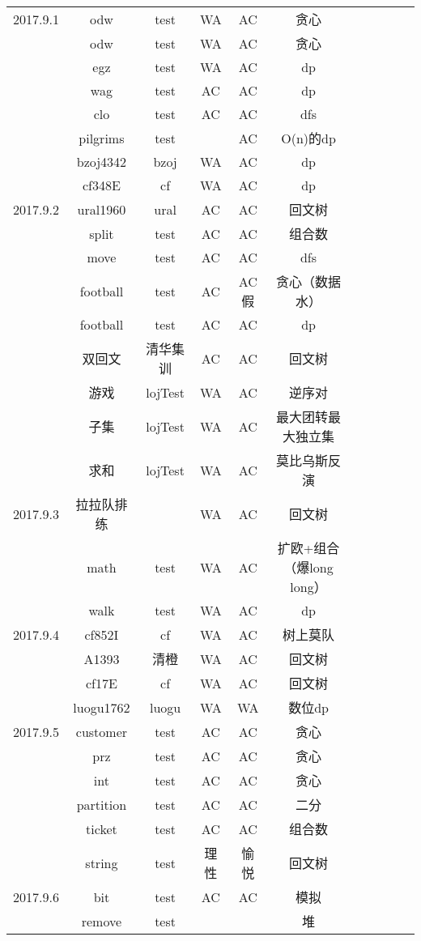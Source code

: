 \documentclass[landscape]{article}
\begin{document}
\begin{longtable}{ccccccccccc}
  \hline
  2017.9.1 & odw & test & WA & AC & 贪心\\
  & odw & test & WA & AC & 贪心\\
  & egz & test & WA & AC & dp\\
  & wag & test & AC & AC & dp\\
  & clo & test & AC & AC & dfs\\
  & pilgrims & test & & AC & O(n)的dp\\
  & bzoj4342 & bzoj & WA & AC & dp\\
  & cf348E & cf & WA & AC & dp\\
  \hline
  2017.9.2 & ural1960 & ural & AC & AC & 回文树\\
  & split & test & AC & AC & 组合数\\
  & move & test & AC & AC & dfs\\
  & football & test & AC & {\color{cyan}AC 假} & 贪心（数据水）\\
  & football & test & AC & AC & dp\\
  & 双回文 & 清华集训 & AC & AC & 回文树\\
  & 游戏 & lojTest & WA & AC & 逆序对\\
  & 子集 & lojTest & WA & AC & 最大团转最大独立集\\
  & 求和 & lojTest & WA & AC & 莫比乌斯反演\\
  \hline
  2017.9.3 & 拉拉队排练 & & WA & AC & 回文树\\
  & math & test & WA & AC & 扩欧+组合（爆long long）\\
  & walk & test & WA & AC & dp\\
  \hline
  2017.9.4 & cf852I & cf & WA & AC & 树上莫队\\
  & A1393 & 清橙 & WA & AC & 回文树\\
  & cf17E & cf & WA & AC & 回文树\\
  & luogu1762 & luogu & WA & {\color{red} WA} & 数位dp\\
  \hline
  2017.9.5 & customer & test & AC & AC & 贪心\\
  & prz & test & AC & AC & 贪心\\
  & int & test & AC & AC & 贪心\\
  & partition & test & AC & AC & 二分\\
  & ticket & test & AC & AC & 组合数\\
  & string & test & 理性 & 愉悦 & 回文树\\
  \hline
  2017.9.6 & bit & test & AC & AC & 模拟\\
  & remove & test & & & 堆\\

\end{longtable}
\end{document}
